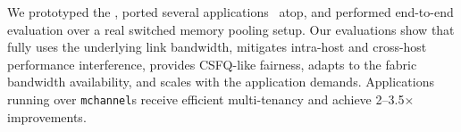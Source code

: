 We prototyped the \sys, ported several applications~\cite{workstealing-ppopp13, trie-accs07, gap-arxiv, mica-nsdi14} atop, and performed end-to-end evaluation over a real switched memory pooling setup. Our evaluations show that \sys fully uses the underlying link bandwidth, mitigates intra-host and cross-host performance interference, provides CSFQ-like fairness, adapts to the fabric bandwidth availability, and scales with the application demands. Applications running over \texttt{mchannel}s receive efficient multi-tenancy and achieve 2--3.5$\times$ improvements.




